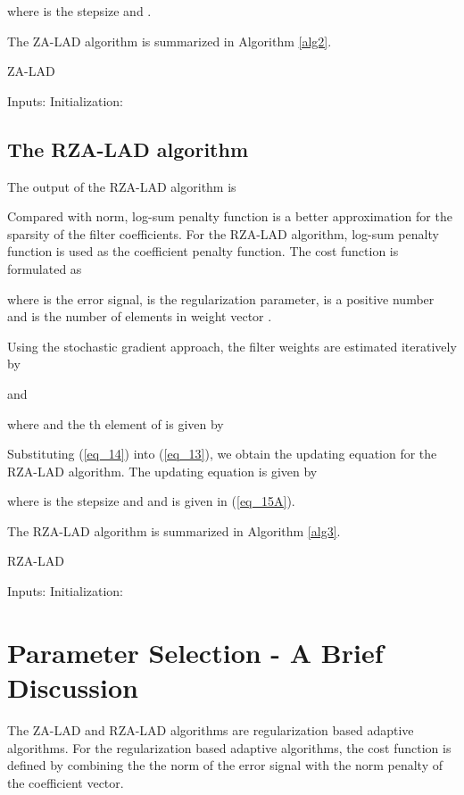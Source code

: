 \documentclass[conference]{IEEEtran}
\begin{document}
where  is the stepsize and .

The ZA-LAD algorithm is summarized in Algorithm \ref{alg2}.
\begin{algorithm}[!h]
\caption{ZA-LAD}
\label{alg2}
\begin{algorithmic}
\STATE   Inputs:  
\STATE  Initialization:  
\FOR{} 
\STATE 
\STATE 
\STATE 
\ENDFOR
\end{algorithmic}
\end{algorithm}
\subsection {The RZA-LAD algorithm}
\label{S2-3}
The output of the RZA-LAD algorithm is 


Compared with  norm, log-sum penalty function is a better approximation for the sparsity of the filter coefficients. For the RZA-LAD algorithm, log-sum penalty function is used as the coefficient penalty function. The cost function is formulated as
\setlength\arraycolsep{0.1em}

where  is the error signal,  is the regularization parameter,  is a positive number and  is the number of elements in weight vector .

Using the stochastic gradient approach, the filter weights are estimated iteratively by

and 

where  and the th element of  is given by

Substituting (\ref{eq_14}) into (\ref{eq_13}), we obtain the updating equation for the RZA-LAD algorithm.
The updating equation is given by

where  is the stepsize and  and  is given in (\ref{eq_15A}).

The RZA-LAD algorithm is summarized in Algorithm \ref{alg3}.
\newpage
\begin{algorithm}[!h]
\caption{RZA-LAD}
\label{alg3}
\begin{algorithmic}
\STATE   Inputs:  
\STATE  Initialization:  
\FOR{} 
\STATE 
\STATE 
\STATE 
\ENDFOR
\end{algorithmic}
\end{algorithm}
\section{Parameter Selection - A Brief Discussion}
\label{S3}
The ZA-LAD and RZA-LAD algorithms are regularization based adaptive algorithms.
For the regularization based adaptive algorithms, the cost function is defined by combining the the  norm of the error signal with the  norm penalty of the coefficient vector. 
\end{document}

